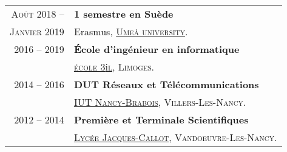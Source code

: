 \begin{supertabular}{rl}
    \textsc{Ao\^ut 2018 --} & \textbf{1 semestre en Su\`ede}\\
    \textsc{Janvier 2019} & Erasmus, \href{https://www.umu.se/en}{\textsc{Umeå university}}.\\[1.5ex]
    \textsc{2016 -- 2019} & \textbf{\'Ecole d'ing\'enieur en informatique}\\
    & \href{https://www.3il-ingenieurs.fr/en}{\textsc{\'ecole 3}i\textsc{l}}, \textsc{Limoges}.\\[1.5ex]
    \textsc{2014 -- 2016} & \textbf{DUT R\'eseaux et T\'el\'ecommunications}\\
    & \href{https://iutnb.univ-lorraine.fr/fr/content/rt-dut}{\textsc{IUT Nancy-Brabois}}, \textsc{Villers-Les-Nancy}.\\[1.5ex]
    \textsc{2012 -- 2014} & \textbf{Premi\`ere et Terminale Scientifiques}\\
    & \href{http://www4.ac-nancy-metz.fr/lyc-jacques-callot}{\textsc{Lyc\'ee Jacques-Callot}}, \textsc{Vandoeuvre-Les-Nancy}.\\
\end{supertabular}

\medskip
